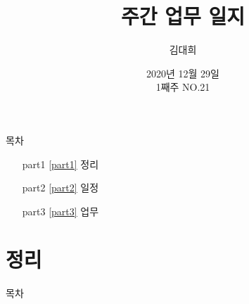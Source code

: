 \documentclass[aspectratio=1610,20pt,xcolor=pdftex,dvipsnames,table,handout]{beamer}
\begin{document}
	

			\title{ 주간 업무 일지 }
			\author{ 김대희 }
			\date{ 2020년 
						12월 				%
						29일\\ 			%
						1째주 			%
						NO.21  }			%


%
%			
%


		\begin{frame}[plain]
		\titlepage
		\end{frame}


		\begin{frame} [plain]{목차}
		\tableofcontents%


			\setlength{\leftmargini}{ 2em}			
			\begin{itemize}

				\item [part1] \ref{part1}	정리
				\item [part2] \ref{part2}	일정
				\item [part3] \ref{part3}	업무

			\end{itemize}


		\end{frame}



		\part{정리 }
		\frame{\partpage}

\label{part1} 	%

		\begin{frame} [plain]{목차}
		\tableofcontents%
		\end{frame}
		
\end{document}
